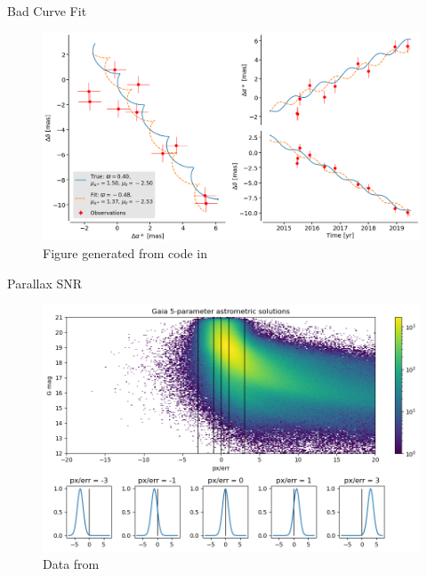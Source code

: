 \documentclass[hyperref={colorlinks = true, linkcolor=blue},8pt]{beamer}
\begin{document}
\begin{frame}{Bad Curve Fit}

		\begin{figure}
			\includegraphics[width=\columnwidth]{astrometric-bad.png}
			\caption{Figure generated from code in \cite{luriGaia2018}}
		\end{figure}

\end{frame}

\begin{frame}{Parallax SNR}
		\begin{figure}
			\includegraphics[width=\columnwidth]{poe_map.png}
			\caption{Data from \cite{collaborationGaia2022}\cite{collaborationGaia2016}}
		\end{figure}
\end{frame}
\end{document}
